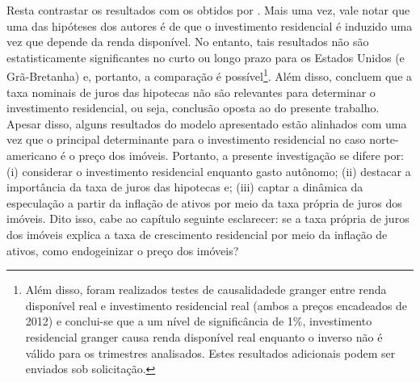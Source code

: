 Resta contrastar os resultados com os obtidos por \textcite{arestis_residential_2015}. Mais uma vez, vale notar que uma das hipóteses dos autores é de que o investimento residencial é induzido uma vez que depende da renda disponível. No entanto, tais resultados não são estatisticamente significantes no curto ou longo prazo para os Estados Unidos (e Grã-Bretanha) e, portanto, a comparação é possível\footnote{Além disso, foram realizados testes de causalidadede granger entre renda disponível real e investimento residencial real (ambos a preços encadeados de 2012) e conclui-se que a um nível de significância de 1\%, investimento residencial granger causa renda disponível real enquanto o inverso não é válido para os trimestres analisados. Estes resultados adicionais podem ser enviados sob solicitação.}. Além disso, concluem que a taxa nominais de juros das hipotecas não são relevantes para determinar o investimento residencial, ou seja, conclusão oposta ao do presente trabalho. Apesar disso, alguns resultados do modelo apresentado estão alinhados com \textcite{arestis_residential_2015} uma vez que o principal determinante para o investimento residencial no caso norte-americano é o preço dos imóveis. Portanto, a presente investigação se difere por: (i) considerar o investimento residencial enquanto gasto autônomo; (ii) destacar a importância da taxa de juros das hipotecas e; (iii) captar a dinâmica da especulação a partir da inflação de ativos por meio da taxa própria de juros dos imóveis.  Dito isso, cabe ao capítulo seguinte esclarecer: se a taxa própria de juros dos imóveis explica a taxa de crescimento residencial por meio da inflação de ativos, como endogeinizar o preço dos imóveis?




